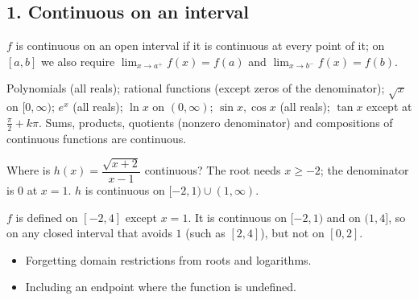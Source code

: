 \subsection*{1. Continuous on an interval}
$f$ is continuous on an open interval if it is continuous at every point of it; on $[a,b]$ we also require $\lim_{x\to a^+}f(x)=f(a)$ and $\lim_{x\to b^-}f(x)=f(b)$.

\begin{keyidea}
Polynomials (all reals); rational functions (except zeros of the denominator); $\sqrt x$ on $[0,\infty)$; $e^x$ (all reals); $\ln x$ on $(0,\infty)$; $\sin x,\cos x$ (all reals); $\tan x$ except at $\frac\pi2+k\pi$. Sums, products, quotients (nonzero denominator) and compositions of continuous functions are continuous.
\end{keyidea}

\begin{example}[Example 1]
Where is $h(x)=\dfrac{\sqrt{x+2}}{x-1}$ continuous?
\sol The root needs $x\ge-2$; the denominator is $0$ at $x=1$. $h$ is continuous on $[-2,1)\cup(1,\infty)$.
\end{example}

\begin{example}
\begin{center}
\end{center}
\sol $f$ is defined on $[-2,4]$ except $x=1$. It is continuous on $[-2,1)$ and on $(1,4]$, so on any closed interval that avoids $1$ (such as $[2,4]$), but not on $[0,2]$.
\end{example}

\begin{mistakes}
\begin{itemize}
\item Forgetting domain restrictions from roots and logarithms.
\item Including an endpoint where the function is undefined.
\end{itemize}
\end{mistakes}

